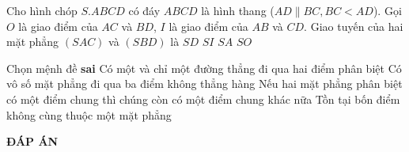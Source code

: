 \begin{ex}%
Cho hình chóp $ S.ABCD $ có đáy $ ABCD $ là hình thang ($ AD\parallel BC, BC<AD $). Gọi $ O $ là giao điểm của $ AC $ và $ BD $, $ I $ là giao điểm của $ AB $ và $ CD $. Giao tuyến của hai mặt phẳng $ (SAC) $ và $ (SBD) $ là
\choice
{$ SD $}
{$ SI $}
{$ SA $}
{\True $ SO $}
\end{ex}

\begin{ex}%
Chọn mệnh đề {\bf sai}
\choice
{Có một và chỉ một đường thẳng đi qua hai điểm phân biệt}
{\True Có vô số mặt phẳng đi qua ba điểm không thẳng hàng}
{Nếu hai mặt phẳng phân biệt có một điểm chung thì chúng còn có một điểm chung khác nữa}
{Tồn tại bốn điểm không cùng thuộc một mặt phẳng}
\end{ex}
\newpage
\begin{center}
	\textbf{ĐÁP ÁN}
\end{center}
\begin{multicols}{10}
	 
\end{multicols}
